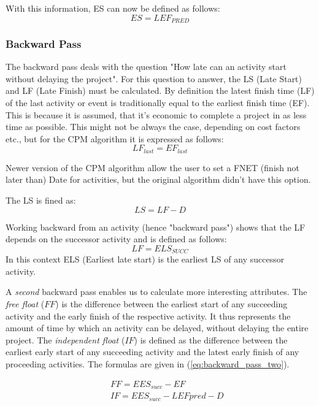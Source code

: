 With this information, ES can now be defined as follows:
\begin{equation}
ES = LEF_{PRED}
\end{equation}

\subsubsection{Backward Pass}
The backward pass deals with the question "How late can an activity start without delaying the project".
For this question to answer, the LS (Late Start) and LF (Late Finish) must be calculated.
By definition the latest finish time (LF) of the last activity or event is traditionally equal to the earliest finish time (EF). This is because it is assumed, that it's economic to complete a project in as less time as possible.\cite{obrien} This might not be always the case, depending on cost factors etc., but for the CPM algorithm it is expressed as follows:
\begin{equation}
LF_{last} = EF_{last}
\end{equation}
 
Newer version of the CPM algorithm allow the user to set a FNET (finish not later than) Date for activities, but the original algorithm didn't have this option.
 
 
The LS is fined as:
\begin{equation}
LS = LF - D
\end{equation}
 
Working backward from an activity (hence "backward pass") shows that the LF depends on the successor activity and is defined as follows:
\begin{equation}
LF = ELS_{SUCC}
\end{equation}
In this context ELS (Earliest late start) is the earliest LS of any successor activity.

A \emph{second} backward pass enables us to calculate more interesting attributes. The \emph{free
float} ($FF$) is the difference between the earliest start of any succeeding activity and the early
finish of the respective activity. It thus represents the amount of time by which an activity can be
delayed, without delaying the entire project.  The \emph{independent float} ($IF$) is defined as the
difference between the earliest early start of any succeeding activity and the latest early finish 
of any proceeding activities. The formulas are given in (\ref{eq:backward_pass_two}).

\begin{eqnarray}
&& FF=EES_{succ}-EF \nonumber\\
&& IF=EES_{succ}-LEF{pred}-D \\
\label{eq:backward_pass_two}
\end{eqnarray}
 
